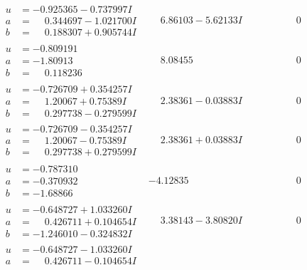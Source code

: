 \documentclass[1p]{elsarticle_modified}
\theoremstyle{definition}
\begin{document}
$$\begin{array}{c|c|c}
\begin{aligned}
u &= -0.925365 - 0.737997 I \\
a &= \phantom{-}0.344697 - 1.021700 I \\
b &= \phantom{-}0.188307 + 0.905744 I\end{aligned}
 & \phantom{-}6.86103 - 5.62133 I & \phantom{-0.000000 } 0 \\ \hline\begin{aligned}
u &= -0.809191\phantom{ +0.000000I} \\
a &= -1.80913\phantom{ +0.000000I} \\
b &= \phantom{-}0.118236\phantom{ +0.000000I}\end{aligned}
 & \phantom{-}8.08455\phantom{ +0.000000I} & \phantom{-0.000000 } 0 \\ \hline\begin{aligned}
u &= -0.726709 + 0.354257 I \\
a &= \phantom{-}1.20067 + 0.75389 I \\
b &= \phantom{-}0.297738 - 0.279599 I\end{aligned}
 & \phantom{-}2.38361 - 0.03883 I & \phantom{-0.000000 } 0 \\ \hline\begin{aligned}
u &= -0.726709 - 0.354257 I \\
a &= \phantom{-}1.20067 - 0.75389 I \\
b &= \phantom{-}0.297738 + 0.279599 I\end{aligned}
 & \phantom{-}2.38361 + 0.03883 I & \phantom{-0.000000 } 0 \\ \hline\begin{aligned}
u &= -0.787310\phantom{ +0.000000I} \\
a &= -0.370932\phantom{ +0.000000I} \\
b &= -1.68866\phantom{ +0.000000I}\end{aligned}
 & -4.12835\phantom{ +0.000000I} & \phantom{-0.000000 } 0 \\ \hline\begin{aligned}
u &= -0.648727 + 1.033260 I \\
a &= \phantom{-}0.426711 + 0.104654 I \\
b &= -1.246010 - 0.324832 I\end{aligned}
 & \phantom{-}3.38143 - 3.80820 I & \phantom{-0.000000 } 0 \\ \hline\begin{aligned}
u &= -0.648727 - 1.033260 I \\
a &= \phantom{-}0.426711 - 0.104654 I \\

\end{aligned}
\end{array}$$
\end{document}
